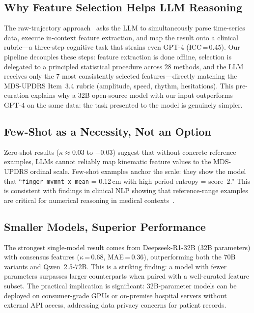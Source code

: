 \documentclass[conference]{IEEEtran}
\begin{document}
\subsection{Why Feature Selection Helps LLM Reasoning}
The raw-trajectory approach~\cite{chen2024chatgpt} asks the LLM to simultaneously parse
time-series data, execute in-context feature extraction, and map the result onto a
clinical rubric---a three-step cognitive task that strains even GPT-4 (ICC\,=\,0.45).
Our pipeline decouples these steps: feature extraction is done offline, selection is
delegated to a principled statistical procedure across 28 methods, and the LLM receives
only the 7 most consistently selected features---directly matching the MDS-UPDRS
Item~3.4 rubric (amplitude, speed, rhythm, hesitations). This pre-curation explains why
a 32B open-source model with our input outperforms GPT-4 on the same data: the task
presented to the model is genuinely simpler.

\subsection{Few-Shot as a Necessity, Not an Option}
Zero-shot results ($\kappa \approx 0.03$ to $-0.03$) suggest that without concrete
reference examples, LLMs cannot reliably map kinematic feature values to the MDS-UPDRS
ordinal scale. Few-shot examples anchor the scale: they show the model that
``\texttt{finger\_mvmnt\_x\_mean} = 0.12\,cm with high period entropy = score~2.'' This
is consistent with findings in clinical NLP showing that reference-range examples are
critical for numerical reasoning in medical contexts~\cite{cite_clinicalnlp}.

\subsection{Smaller Models, Superior Performance}
The strongest single-model result comes from Deepseek-R1-32B (32B parameters) with
consensus features ($\kappa$\,=\,0.68, MAE\,=\,0.36), outperforming both the 70B variants and
Qwen~2.5-72B. This is a striking finding: a model with fewer parameters surpasses larger
counterparts when paired with a well-curated feature subset. The practical implication is
significant: 32B-parameter models can be deployed on consumer-grade GPUs or on-premise
hospital servers without external API access, addressing data privacy concerns for patient
records.
\end{document}
